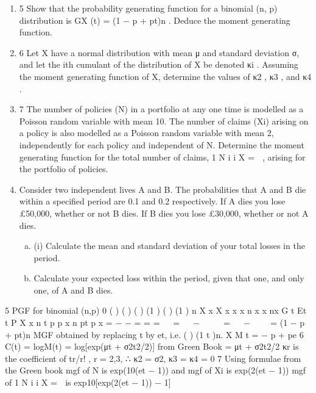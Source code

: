 \documentclass[a4paper,12pt]{article}
\begin{document}
\begin{enumerate}
\item 5 Show that the probability generating function for a binomial (n, p) distribution is
GX (t) = (1 − p + pt)n .
Deduce the moment generating function. 
\item 6 Let X have a normal distribution with mean μ and standard deviation σ, and let
the ith cumulant of the distribution of X be denoted κi .
Assuming the moment generating function of X, determine the values of κ2 , κ3 ,
and κ4 . 
\item 7 The number of policies (N) in a portfolio at any one time is modelled as a Poisson
random variable with mean 10.
The number of claims (Xi) arising on a policy is also modelled as a Poisson
random variable with mean 2, independently for each policy and independent
of N.
Determine the moment generating function for the total number of claims,
1
N
i
i
X
= 
,
arising for the portfolio of policies. 
\item Consider two independent lives A and B. The probabilities that A and B die
within a specified period are 0.1 and 0.2 respectively. If A dies you lose £50,000,
whether or not B dies. If B dies you lose £30,000, whether or not A dies.
\begin{enumerate}[(a)]
    \item (i) Calculate the mean and standard deviation of your total losses in the
period.
\item Calculate your expected loss within the period, given that one, and only
one, of A and B dies. 
\end{enumerate}

\end{enumerate}
\newpage

5 PGF for binomial (n,p)
0
( ) ( ) ( )
(1 )
( ) (1 )
n
X x
X
x
x x n x
x nx
G t Et t P X x
n
t p p
x
n
pt p
x
=
−
−
= = =
 
=   −
 
 
=   −
 



= (1 − p + pt)n
MGF obtained by replacing t by et, i.e. ( ) (1 t )n.
X M t = − p + pe
6 C(t) = logM(t) = log[exp(μt + σ2t2/2)] from Green Book
= μt + σ2t2/2
κr is the coefficient of tr/r! , r = 2,3,
∴ κ2 = σ2, κ3 = κ4 = 0
7 Using formulae from the Green book
mgf of N is exp(10(et − 1)) and mgf of Xi  is exp(2(et − 1))
mgf of
1
N
i
i
X
= 
is exp{10[exp(2(et − 1)) − 1]}
\end{document}
